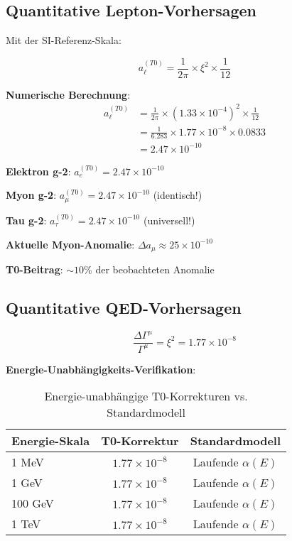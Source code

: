 \documentclass[12pt,a4paper]{article}
\newcommand{\xipar}{\xi}
\theoremstyle{definition}
\theoremstyle{remark}
\begin{document}
	\subsection{Quantitative Lepton-Vorhersagen}
	
	Mit der SI-Referenz-Skala:
	
	\begin{equation}
		a_{\ell}^{(T0)} = \frac{1}{2\pi} \times \xipar^2 \times \frac{1}{12}
		\label{eq:quantitative_lepton_correction}
	\end{equation}
	
	\textbf{Numerische Berechnung}:
	\begin{align}
		a_{\ell}^{(T0)} &= \frac{1}{2\pi} \times (1.33 \times 10^{-4})^2 \times \frac{1}{12} \\
		&= \frac{1}{6.283} \times 1.77 \times 10^{-8} \times 0.0833 \\
		&= 2.47 \times 10^{-10}
	\end{align}
	
	\begin{tcolorbox}[colback=blue!5!white,colframe=blue!75!black,title=Universelle Lepton-Vorhersage]
		\textbf{Elektron g-2}: $a_e^{(T0)} = 2.47 \times 10^{-10}$
		
		\textbf{Myon g-2}: $a_{\mu}^{(T0)} = 2.47 \times 10^{-10}$ (identisch!)
		
		\textbf{Tau g-2}: $a_{\tau}^{(T0)} = 2.47 \times 10^{-10}$ (universell!)
		
		\textbf{Aktuelle Myon-Anomalie}: $\Delta a_{\mu} \approx 25 \times 10^{-10}$
		
		\textbf{T0-Beitrag}: $\sim 10\%$ der beobachteten Anomalie
	\end{tcolorbox}
	
	\subsection{Quantitative QED-Vorhersagen}
	
	\begin{equation}
		\frac{\Delta\Gamma^{\mu}}{\Gamma^{\mu}} = \xipar^2 = 1.77 \times 10^{-8}
		\label{eq:quantitative_qed_correction}
	\end{equation}
	
	\textbf{Energie-Unabhängigkeits-Verifikation}:
	\begin{table}[htbp]
		\centering
		\begin{tabular}{lcc}
			\toprule
			\textbf{Energie-Skala} & \textbf{T0-Korrektur} & \textbf{Standardmodell} \\
			\midrule
			1 MeV & $1.77 \times 10^{-8}$ & Laufende $\alpha(E)$ \\
			1 GeV & $1.77 \times 10^{-8}$ & Laufende $\alpha(E)$ \\
			100 GeV & $1.77 \times 10^{-8}$ & Laufende $\alpha(E)$ \\
			1 TeV & $1.77 \times 10^{-8}$ & Laufende $\alpha(E)$ \\
			\bottomrule
		\end{tabular}
		\caption{Energie-unabhängige T0-Korrekturen vs. Standardmodell}
	\end{table}
	
\end{document}
